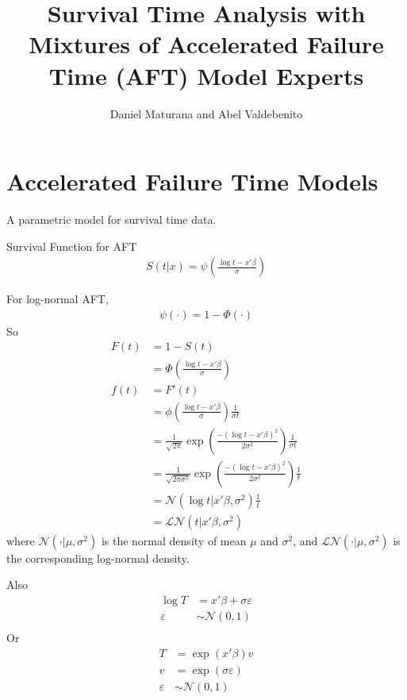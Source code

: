 \documentclass[11pt,letterpaper]{article}
\title{Survival Time Analysis with Mixtures of Accelerated Failure Time (AFT) Model Experts}
\author{Daniel Maturana and Abel Valdebenito}
\begin{document}
\maketitle

\section{Accelerated Failure Time Models}

A parametric model for survival time data.

Survival Function for AFT
\begin{align*}
    S(t|x) = \psi \left(  \frac{ \log t - x'\beta}{\sigma}\right)
\end{align*}

For log-normal AFT,
\begin{align*}
    \psi(\cdot) = 1 - \Phi(\cdot)
\end{align*}
So
\begin{align*}
    F(t) &= 1 - S(t) \\
         &= \Phi\left( \frac{\log t - x'\beta}{\sigma} \right) \\
    f(t) &= F'(t) \\
         &= \phi\left( \frac{\log t - x'\beta}{\sigma} \right) \frac{1}{ \sigma t } \\
         &= \frac{1}{\sqrt{2 \pi}} \exp\left( \frac{ -(\log t - x'\beta)^2 }{ 2\sigma^2} \right) \frac{1}{\sigma t} \\
         &= \frac{1}{\sqrt{2 \pi \sigma^2}} \exp\left( \frac{ -(\log t - x'\beta)^2 }{ 2\sigma^2} \right) \frac{1}{t} \\
         &= \mathcal{N}( \log t | x'\beta, \sigma^2 ) \frac{1}{t} \\
         &= \mathcal{LN}( t | x'\beta, \sigma^2 )
\end{align*}
where $\mathcal{N}(\cdot|\mu, \sigma^2)$ is the normal density of mean $\mu$ and $\sigma^2$, and
$\mathcal{LN}(\cdot|\mu, \sigma^2)$ is the corresponding log-normal density.

Also
\begin{align*}
    \log T  &= x'\beta + \sigma \varepsilon \\
    \varepsilon &\sim \mathcal{N}(0, 1) \\
\end{align*}
Or
\begin{align*}
     T  &= \exp(x'\beta) v \\
     v  &= \exp(\sigma \varepsilon) \\
     \varepsilon &\sim \mathcal{N}(0, 1)
\end{align*}
\end{document}
